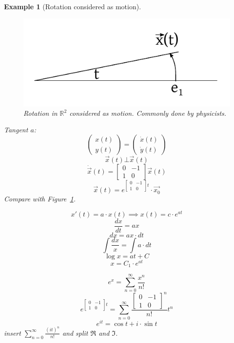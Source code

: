 \documentclass{article}
\newcounter{lecref}[section]
\numberwithin{lecref}{section}
\newtheorem{example}[lecref]{Example}
\newcommand{\vectwo}[2]{\begin{pmatrix} #1 \\ #2 \end{pmatrix}}
\begin{document}
\begin{example}[Rotation considered as motion]
  \begin{figure}[t]
    \begin{center}
      \includegraphics{img/14_rotation_as_motion.pdf}
      \caption{Rotation in $\mathbb R^2$ considered as motion. Commonly done by physicists.}
      \label{img:rotr2mot}
    \end{center}
  \end{figure}

  Tangent $a$:
  \[ \vectwo{x(t)}{y(t)} = \vectwo{\dot{x}(t)}{\dot{y}(t)} \]
  \[ \vec x(t) \bot \vec{x}(t) \]
  \[ \dot\vec{x}(t) = \begin{bmatrix} 0 & -1 \\ 1 & 0 \end{bmatrix} \vec{x}(t) \]
  \[ \vec{x}(t) = e^{\begin{bmatrix} 0 & -1 \\ 1 & 0 \end{bmatrix} t} \cdot \vec{x_0} \]
  Compare with Figure~\ref{img:rotr2mot}.

  \[ x'(t) = a\cdot x(t) \implies x(t) = c \cdot e^{at} \]
  \[ \frac{dx}{dt} = ax \]
  \[ dx = ax \cdot dt \]
  \[ \int \frac{dx}{x} = \int a \cdot dt \]
  \[ \log{x} = at + C \]
  \[ x = C_1 \cdot e^{at} \]

  \[ e^x = \sum_{n=0}^\infty \frac{x^n}{n!} \]
  \[ e^{\begin{bmatrix} 0 & -1 \\ 1 & 0 \end{bmatrix}t} = \sum_{n=0}^\infty \frac{\begin{bmatrix} 0 & -1 \\ 1 & 0 \end{bmatrix}^n}{n!} t^n \]
  \[ e^{it} = \cos{t} + i \cdot \sin{t} \]
  insert $\sum_{n=0}^\infty \frac{(it)^n}{n!}$ and split $\Re$ and $\Im$.


\end{example}
\end{document}
